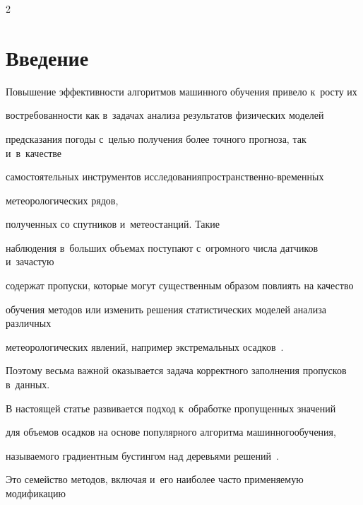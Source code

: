 \thispagestyle{headings}



\begin{multicols}{2}



\label{st\stat}





\section{Введение}



Повышение эффективности алгоритмов машинного обучения привело к~росту их 

востребо\-ванности как в~задачах анализа результатов физических моделей 

предсказания погоды с~целью получения более точного прогноза, так и~в~качестве 

самостоятельных инструментов исследования\linebreak про\-стран\-ственно-вре\-мен\-н$\acute{\mbox{ы}}$х 

метеорологических рядов, %

полученных со спутников и~метеостанций. Такие %

наблюдения в~больших объемах поступают с~огромного числа датчиков и~зачастую 

содержат пропуски, которые могут существенным образом повлиять на качество 

обучения методов или изменить решения статистических моделей анализа различных 

метеорологических явлений, например экстремальных осадков~\cite{Gorshenin2018c}. 

Поэтому  весьма важной оказывается задача корректного заполнения пропусков в~данных.



В настоящей статье развивается подход к~обработке пропущенных значений 

для объемов осадков на основе популярного алгоритма машинного\linebreak обучения, 

называемого градиентным бустингом над деревьями решений~\cite{Friedman2001}. 

Это семейство методов, включая и~его наиболее час\-то применяемую модификацию 


\end{multicols}
